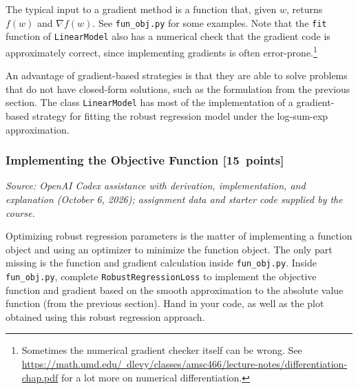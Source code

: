\documentclass{article}
\newcommand{\blu}[1]{{\textcolor{blu}{#1}}}
\let\ask\blu
\newcommand\pts[1]{\textcolor{pointscolour}{[#1~points]}}
\begin{document}
The typical input to a gradient method is a function that, given $w$,
returns $f(w)$ and $\nabla f(w)$. See \texttt{fun\_obj.py} for some
examples. Note that the \texttt{fit} function of \texttt{LinearModel}
also has a numerical check that the gradient code is approximately
correct, since implementing gradients is often
error-prone.\footnote{Sometimes the numerical gradient checker itself
can be wrong. See \href{https://math.umd.edu/~dlevy/classes/amsc466/lecture-notes/differentiation-chap.pdf}{https://math.umd.edu/~dlevy/classes/amsc466/lecture-notes/differentiation-chap.pdf} for a lot more on numerical differentiation.}

An advantage of gradient-based strategies is that they are able to solve
problems that do not have closed-form solutions, such as the formulation from the
previous section. The class \texttt{LinearModel} has most of the implementation
of a gradient-based strategy for fitting the robust regression model under the log-sum-exp approximation.

\subsubsection{Implementing the Objective Function \pts{15}}
\par\textit{Source: OpenAI Codex assistance with derivation, implementation, and explanation (October 6, 2026); assignment data and starter code supplied by the course.}\par


Optimizing robust regression parameters is the matter of implementing a function object and using an optimizer to minimize the function object. The only part missing is the function and gradient calculation inside \texttt{fun\_obj.py}.
\ask{Inside \texttt{fun\_obj.py}, complete \texttt{RobustRegressionLoss} to implement the objective function and gradient based on the smooth
approximation to the absolute value function (from the previous section). Hand in your code, as well
as the plot obtained using this robust regression approach.}
\end{document}
